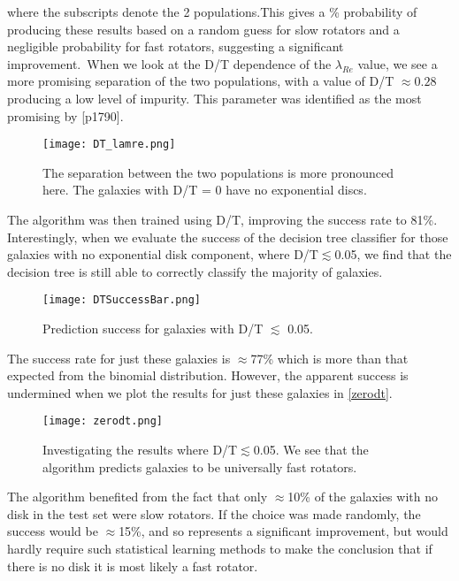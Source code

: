 where the subscripts denote the 2 populations.This gives a \% probability of producing these results based on a random guess for slow rotators and a negligible probability for fast rotators, suggesting a significant improvement.\
When we look at the D/T dependence of the $\lambda_{Re}$ value, we see a more promising separation of the two populations, with a value of D/T $\approx 0.28$ producing a low level of impurity. This parameter was identified as the most promising by \cite{Krajnovic2013}[p1790].
\begin{figure}[h]
	\centering
	\texttt{[image: DT\_lamre.png]}
	\caption{The separation between the two populations is more pronounced here. The galaxies with D/T = 0 have no exponential discs.
	}
	\label{fig:dtlamre}
\end{figure}
The algorithm was then trained using D/T, improving the success rate to 81\%. Interestingly, when we evaluate the success of the decision tree classifier for those galaxies with no exponential disk component, where D/T$\lesssim $0.05, we find that the decision tree is still able to correctly classify the majority of galaxies.
\begin{figure}[h!]
	\centering
	\texttt{[image: DTSuccessBar.png]}
	\caption{Prediction success for galaxies with D/T $\lesssim$ 0.05.}
	\label{fig:dtbar}
\end{figure}
The success rate for just these galaxies is $\approx$77\% which is more than that expected from the binomial distribution. However, the apparent success is undermined when we plot the results for just these galaxies in \ref{zerodt}.
\begin{figure}[h!]
	\centering
	\texttt{[image: zerodt.png]}
	\caption{Investigating the results where D/T$\lesssim $0.05. We see that the algorithm predicts galaxies to be universally fast rotators.
	}
	\label{fig:zerodt}
\end{figure}
The algorithm benefited from the fact that only $\approx$10\% of the galaxies with no disk in the test set were slow rotators. If the choice was made randomly, the success would be $\approx$15\%, and so represents a significant improvement, but would hardly require such statistical learning methods to make the conclusion that if there is no disk it is most likely a fast rotator.

